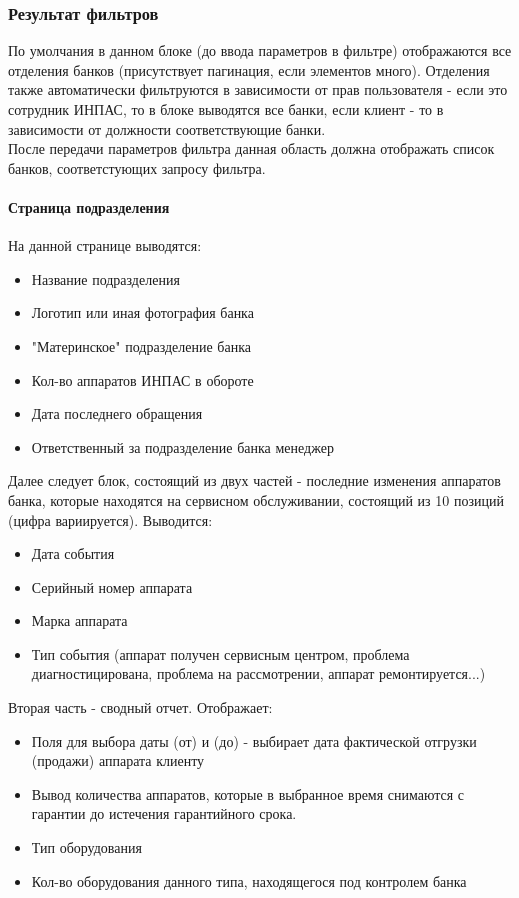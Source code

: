 \documentclass[DIV=calc, paper=a4, fontsize=11pt]{scrartcl} %
\begin{document}
\subsubsection{Результат фильтров}
По умолчания в данном блоке (до ввода параметров в фильтре) отображаются все отделения банков (присутствует пагинация, если элементов много). Отделения также автоматически фильтруются в зависимости от прав пользователя - если это сотрудник ИНПАС, то в блоке выводятся все банки, если клиент - то в зависимости от должности соответствующие банки.
\\[0.5cm]
После передачи параметров фильтра данная область должна отображать список банков, соответстующих запросу фильтра.

\paragraph{Страница подразделения}
На данной странице выводятся:

\begin{itemize}
	\item Название подразделения
	\item Логотип или иная фотография банка
	\item "Материнское" подразделение банка
	\item Кол-во аппаратов ИНПАС в обороте
	\item Дата последнего обращения
	\item Ответственный за подразделение банка менеджер
\end{itemize}

Далее следует блок, состоящий из двух частей - последние изменения аппаратов банка, которые находятся на сервисном обслуживании, состоящий из 10 позиций (цифра вариируется). Выводится:

\begin{itemize}
	\item Дата события
	\item Серийный номер аппарата
	\item Марка аппарата
	\item Тип события (аппарат получен сервисным центром, проблема диагностицирована, проблема на рассмотрении, аппарат ремонтируется...)
\end{itemize}

Вторая часть - сводный отчет. Отображает:


\begin{itemize}
	\item Поля для выбора даты (от) и (до) - выбирает дата фактической отгрузки (продажи) аппарата клиенту
	\item Вывод количества аппаратов, которые в выбранное время снимаются с гарантии до истечения гарантийного срока.
	\item Тип оборудования
	\item Кол-во оборудования данного типа, находящегося под контролем банка
\end{itemize}
\end{document}
